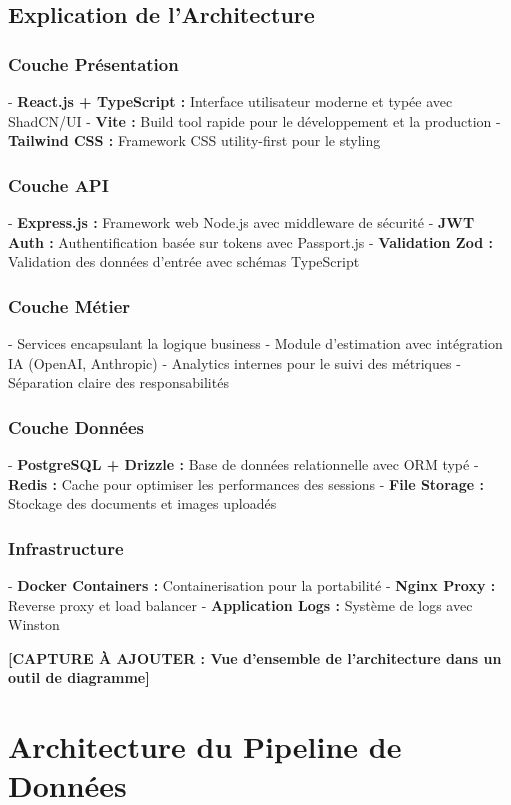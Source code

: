 \subsection{Explication de l'Architecture}

\subsubsection{Couche Présentation}
- \textbf{React.js + TypeScript :} Interface utilisateur moderne et typée avec ShadCN/UI
- \textbf{Vite :} Build tool rapide pour le développement et la production
- \textbf{Tailwind CSS :} Framework CSS utility-first pour le styling

\subsubsection{Couche API}
- \textbf{Express.js :} Framework web Node.js avec middleware de sécurité
- \textbf{JWT Auth :} Authentification basée sur tokens avec Passport.js
- \textbf{Validation Zod :} Validation des données d'entrée avec schémas TypeScript

\subsubsection{Couche Métier}
- Services encapsulant la logique business
- Module d'estimation avec intégration IA (OpenAI, Anthropic)
- Analytics internes pour le suivi des métriques
- Séparation claire des responsabilités

\subsubsection{Couche Données}
- \textbf{PostgreSQL + Drizzle :} Base de données relationnelle avec ORM typé
- \textbf{Redis :} Cache pour optimiser les performances des sessions
- \textbf{File Storage :} Stockage des documents et images uploadés

\subsubsection{Infrastructure}
- \textbf{Docker Containers :} Containerisation pour la portabilité
- \textbf{Nginx Proxy :} Reverse proxy et load balancer
- \textbf{Application Logs :} Système de logs avec Winston

\textbf{[CAPTURE À AJOUTER : Vue d'ensemble de l'architecture dans un outil de diagramme]}

\section{Architecture du Pipeline de Données}

